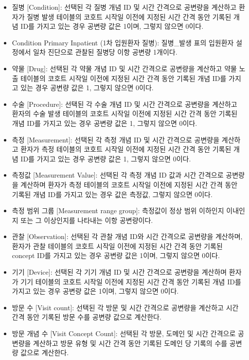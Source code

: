 \documentclass[11pt]{book}
\providecommand{\tightlist}{%
  \setlength{\itemsep}{0pt}\setlength{\parskip}{0pt}}
\theoremstyle{definition}
\theoremstyle{definition}
\theoremstyle{definition}
\theoremstyle{remark}
\begin{document}
\begin{itemize}
\tightlist
\item
  질병 {[}Condition{]}: 선택된 각 질병 개념 ID 및 시간 간격으로 공변량을
  계산하고 환자가 질병 발생 테이블의 코호트 시작일 이전에 지정된 시간
  간격 동안 기록된 개념 ID를 가지고 있는 경우 공변량 값은 1이며, 그렇지
  않으면 0이다.
\item
  Condition Primary Inpatient (1차 입원환자 질병): 질병\_발생 표의
  입원환자 설정에서 일차 진단으로 관찰된 질병당 이항 공변량 1개이다.
\item
  약물 {[}Drug{]}: 선택된 각 약물 개념 ID 및 시간 간격으로 공변량을
  계산하고 약물 노출 테이블의 코호트 시작일 이전에 지정된 시간 간격 동안
  기록된 개념 ID를 가지고 있는 경우 공변량 값은 1, 그렇지 않으면 0이다.
\item
  수술 {[}Procedure{]}: 선택된 각 수술 개념 ID 및 시간 간격으로 공변량을
  계산하고 환자의 수술 발생 테이블의 코호트 시작일 이전에 지정된 시간
  간격 동안 기록된 개념 ID를 가지고 있는 경우 공변량 값은 1, 그렇지
  않으면 0이다.
\item
  측정 {[}Measurement{]}: 선택된 각 측정 개념 ID 및 시간 간격으로
  공변량을 계산하고 환자가 측정 테이블의 코호트 시작일 이전에 지정된
  시간 간격 동안 기록된 개념 ID를 가지고 있는 경우 공변량 값은 1, 그렇지
  않으면 0이다.
\item
  측정값 {[}Measurement Value{]}: 선택된 각 측정 개념 ID 값과 시간
  간격으로 공변량을 계산하며 환자가 측정 테이블의 코호트 시작일 이전에
  지정된 시간 간격 동안 기록된 개념 ID를 가지고 있는 경우 값은 측정값,
  그렇지 않으면 0이다.
\item
  측정 범위 그룹 {[}Measurement range group{]}: 측정값이 정상 범위
  이하인지 이내인지 또는 그 이상인지를 나타내는 이항 공변량이다.
\item
  관찰 {[}Observation{]}: 선택된 각 관찰 개념 ID와 시간 간격으로
  공변량을 계산하며, 환자가 관찰 테이블의 코호트 시작일 이전에 지정된
  시간 간격 동안 기록된 concept ID를 가지고 있는 경우 공변량 값은 1이며,
  그렇지 않으면 0이다.
\item
  기기 {[}Device{]}: 선택된 각 기기 개념 ID 및 시간 간격으로 공변량을
  계산하며 환자가 기기 테이블의 코호트 시작일 이전에 지정된 시간 간격
  동안 기록된 개념 ID를 가지고 있는 경우 공변량 값은 1이며, 그렇지
  않으면 0이다.
\item
  방문 수 {[}Visit count{]}: 선택된 각 방문 및 시간 간격으로 공변량을
  계산하고 시간 간격 동안 기록된 방문 수를 공변량 값으로 계산한다.
\item
  방문 개념 수 {[}Visit Concept Count{]}: 선택된 각 방문, 도메인 및 시간
  간격으로 공변량을 계산하고 방문 유형 및 시간 간격 동안 기록된 도메인
  당 기록의 수를 공변량 값으로 계산한다.
\end{itemize}
\end{document}
